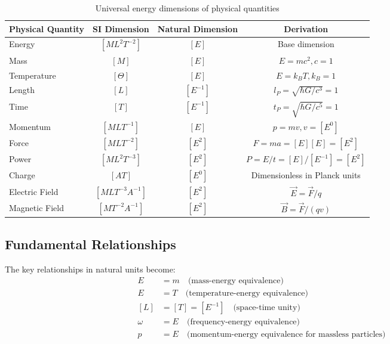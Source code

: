 \documentclass[11pt,a4paper]{article}
\begin{document}
	\begin{table}[htbp]
		\centering
		\begin{adjustbox}{width=0.9\textwidth}
			\begin{tabular}{lccc}
				\toprule
				\textbf{Physical Quantity} & \textbf{SI Dimension} & \textbf{Natural Dimension} & \textbf{Derivation} \\
				\midrule
				Energy & $[ML^2T^{-2}]$ & $[E]$ & Base dimension \\
				Mass & $[M]$ & $[E]$ & $E = mc^2, c = 1$ \\
				Temperature & $[\Theta]$ & $[E]$ & $E = k_BT, k_B = 1$ \\
				Length & $[L]$ & $[E^{-1}]$ & $l_P = \sqrt{\hbar G/c^3} = 1$ \\
				Time & $[T]$ & $[E^{-1}]$ & $t_P = \sqrt{\hbar G/c^5} = 1$ \\
				Momentum & $[MLT^{-1}]$ & $[E]$ & $p = mv, v = [E^0]$ \\
				Force & $[MLT^{-2}]$ & $[E^2]$ & $F = ma = [E][E] = [E^2]$ \\
				Power & $[ML^2T^{-3}]$ & $[E^2]$ & $P = E/t = [E]/[E^{-1}] = [E^2]$ \\
						Charge & $[AT]$ & $[E^0]$ & Dimensionless in Planck units \\
				Electric Field & $[MLT^{-3}A^{-1}]$ & $[E^2]$ & $\vec{E} = \vec{F}/q$ \\
				Magnetic Field & $[MT^{-2}A^{-1}]$ & $[E^2]$ & $\vec{B} = \vec{F}/(qv)$ \\
				\bottomrule
			\end{tabular}
		\end{adjustbox}
		\caption{Universal energy dimensions of physical quantities}
		\label{tab:energy_dimensions}
	\end{table}
	
	\subsection{Fundamental Relationships}
	
	The key relationships in natural units become:
	\begin{align}
		E &= m \quad \text{(mass-energy equivalence)} \\
		E &= T \quad \text{(temperature-energy equivalence)} \\
		[L] &= [T] = [E^{-1}] \quad \text{(space-time unity)} \\
		\omega &= E \quad \text{(frequency-energy equivalence)} \\
		p &= E \quad \text{(momentum-energy equivalence for massless particles)}
	\end{align}
	
\end{document}
